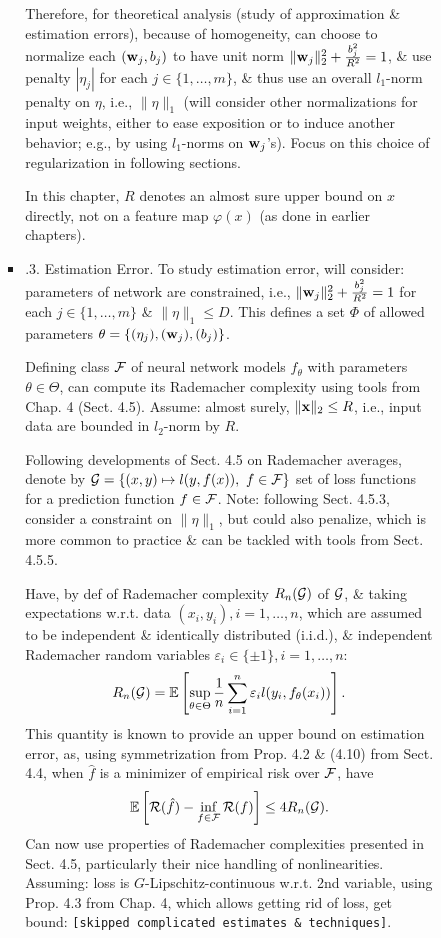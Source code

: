 \documentclass{article}
\begin{document}
\begin{enumerate}
\begin{itemize}
\begin{itemize}
\begin{itemize}
				Therefore, for theoretical analysis (study of approximation \& estimation errors), because of homogeneity, can choose to normalize each $({\bf w}_j,b_j)$ to have unit norm $\|{\bf w}_j\|_2^2 + \frac{b_j^2}{R^2} = 1$, \& use penalty $|\eta_j|$ for each $j\in\{1,\ldots,m\}$, \& thus use an overall $l_1$-norm penalty on $\eta$, i.e., $\|\eta\|_1$ (will consider other normalizations for input weights, either to ease exposition or to induce another behavior; e.g., by using $l_1$-norms on ${\bf w}_j$'s). Focus on this choice of regularization in following sections.
				
				In this chapter, $R$ denotes an almost sure upper bound on $x$ directly, not on a feature map $\varphi(x)$ (as done in earlier chapters).
				\item {.3. Estimation Error.} To study estimation error, will consider: parameters of network are constrained, i.e., $\|{\bf w}_j\|_2^2 + \frac{b_j^2}{R^2} = 1$ for each $j\in\{1,\ldots,m\}$ \& $\|\eta\|_1\le D$. This defines a set $\Phi$ of allowed parameters $\theta = \{(\eta_j),({\bf w}_j),(b_j)\}$.
				
				Defining class ${\cal F}$ of neural network models $f_\theta$ with parameters $\theta\in\Theta$, can compute its Rademacher complexity using tools from Chap. 4 (Sect. 4.5). Assume: almost surely, $\|{\bf x}\|_2\le R$, i.e., input data are bounded in $l_2$-norm by $R$.
				
				Following developments of Sect. 4.5 on Rademacher averages, denote by ${\cal G} = \{(x,y)\mapsto l(y,f(x)),\ f\in{\cal F}\}$ set of loss functions for a prediction function $f\in{\cal F}$. Note: following Sect. 4.5.3, consider a constraint on $\|\eta\|_1$, but could also penalize, which is more common to practice \& can be tackled with tools from Sect. 4.5.5.
				
				Have, by def of Rademacher complexity $R_n({\cal G})$ of ${\cal G}$, \& taking expectations w.r.t. data $(x_i,y_i),i = 1,\ldots,n$, which are assumed to be independent \& identically distributed (i.i.d.), \& independent Rademacher random variables $\varepsilon_i\in\{\pm1\},i = 1,\ldots,n$:
				\begin{equation}
					R_n({\cal G}) = \mathbb{E}\left[\sup_{\theta\in\Theta} \frac{1}{n}\sum_{i=1}^n \varepsilon_il(y_i,f_\theta(x_i))\right].
				\end{equation}
				This quantity is known to provide an upper bound on estimation error, as, using symmetrization from Prop. 4.2 \& (4.10) from Sect. 4.4, when $\hat{f}$ is a minimizer of empirical risk over ${\cal F}$, have
				\begin{equation}
					\mathbb{E}\left[{\cal R}(\hat{f}) - \inf_{f\in{\cal F}} {\cal R}(f)\right]\le4R_n({\cal G}).
				\end{equation}
				Can now use properties of Rademacher complexities presented in Sect. 4.5, particularly their nice handling of nonlinearities. Assuming: loss is $G$-Lipschitz-continuous w.r.t. 2nd variable, using Prop. 4.3 from Chap. 4, which allows getting rid of loss, get bound: {\tt[skipped complicated estimates \& techniques]}.
				

\end{itemize}
\end{itemize}
\end{itemize}
\end{enumerate}
\end{document}
